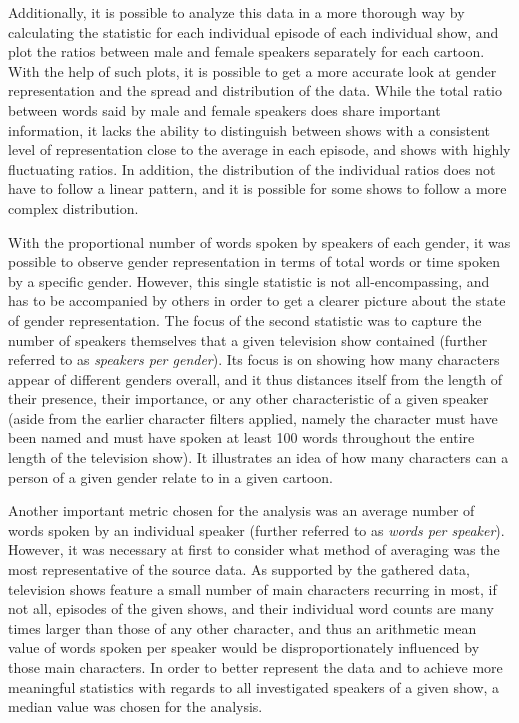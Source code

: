 \documentclass[a4paper, 11pt]{article}
\begin{document}
Additionally, it is possible to analyze this data in a more thorough way by calculating the statistic for each individual episode of each individual show, and plot the ratios between male and female speakers separately for each cartoon. With the help of such plots, it is possible to get a more accurate look at gender representation and the spread and distribution of the data. While the total ratio between words said by male and female speakers does share important information, it lacks the ability to distinguish between shows with a consistent level of representation close to the average in each episode, and shows with highly fluctuating ratios. In addition, the distribution of the individual ratios does not have to follow a linear pattern, and it is possible for some shows to follow a more complex distribution.

With the proportional number of words spoken by speakers of each gender, it was possible to observe gender representation in terms of total words or time spoken by a specific gender. However, this single statistic is not all-encompassing, and has to be accompanied by others in order to get a clearer picture about the state of gender representation. The focus of the second statistic was to capture the number of speakers themselves that a given television show contained (further referred to as \textit{speakers per gender}). Its focus is on showing how many characters appear of different genders overall, and it thus distances itself from the length of their presence, their importance, or any other characteristic of a given speaker (aside from the earlier character filters applied, namely the character must have been named and must have spoken at least 100 words throughout the entire length of the television show). It illustrates an idea of how many characters can a person of a given gender relate to in a given cartoon.

Another important metric chosen for the analysis was an average number of words spoken by an individual speaker (further referred to as \textit{words per speaker}). However, it was necessary at first to consider what method of averaging was the most representative of the source data. As supported by the gathered data, television shows feature a small number of main characters recurring in most, if not all, episodes of the given shows, and their individual word counts are many times larger than those of any other character, and thus an arithmetic mean value of words spoken per speaker would be disproportionately influenced by those main characters. In order to better represent the data and to achieve more meaningful statistics with regards to all investigated speakers of a given show, a median value was chosen for the analysis.
\end{document}
